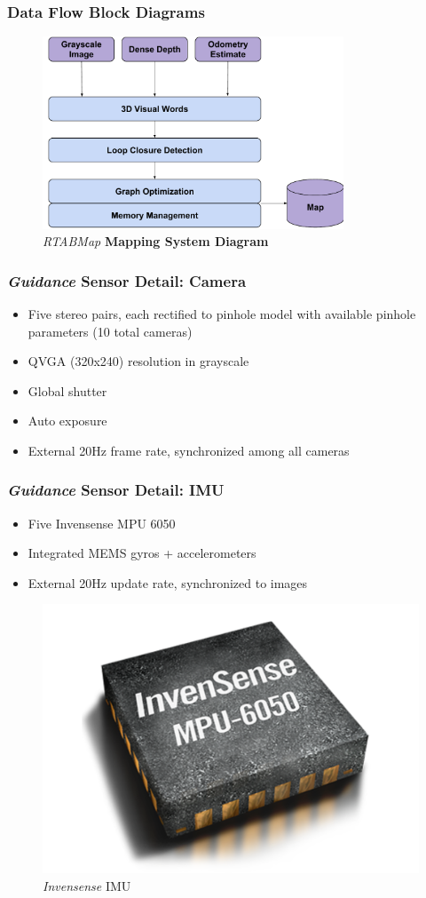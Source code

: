 \documentclass{beamer}
\begin{document}
\begin{frame}
\frametitle{Data Flow Block Diagrams}
\vspace{1.6\baselineskip}
\begin{figure}
\vspace{-0.5cm}
\includegraphics[width=0.8\textwidth]{figures/RTABMapBlock}
\caption{\textit{RTABMap} \textbf{ Mapping System Diagram}}
\end{figure}
\end{frame}

\begin{frame}
\frametitle{\textit{Guidance} Sensor Detail: Camera}
\begin{itemize}
\item{Five stereo pairs, each rectified to pinhole model with available pinhole parameters (10 total cameras)}
\item{QVGA (320x240) resolution in grayscale}
\item{Global shutter}
\item{Auto exposure}
\item{External 20Hz frame rate, synchronized among all cameras}
\end{itemize}
\end{frame}

\begin{frame}
\frametitle{\textit{Guidance} Sensor Detail: IMU}
\begin{itemize}
\item{Five Invensense MPU 6050}
\item{Integrated MEMS gyros + accelerometers}
\item{External 20Hz update rate, synchronized to images}
\end{itemize}
\begin{figure}
\includegraphics[width=0.3\linewidth]{figures/imu-6050}
\caption{\textit{Invensense} IMU}
\end{figure}
\end{frame}
\end{document}
